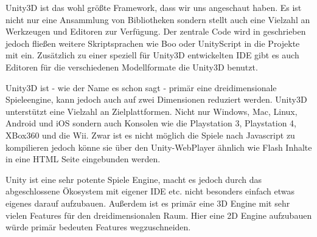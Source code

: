 Unity3D ist das wohl größte Framework, dass wir uns angeschaut haben. Es ist nicht nur eine Ansammlung von Bibliotheken sondern stellt auch eine Vielzahl an Werkzeugen und Editoren zur Verfügung. Der zentrale Code wird in \CS geschrieben jedoch fließen weitere Skriptsprachen wie Boo oder UnityScript in die Projekte mit ein.
Zusätzlich zu einer speziell für Unity3D entwickelten IDE gibt es auch Editoren für die verschiedenen Modellformate die Unity3D benutzt.

Unity3D ist - wie der Name es schon sagt - primär eine dreidimensionale Spieleengine, kann jedoch auch auf zwei Dimensionen reduziert werden.
Unity3D unterstützt eine Vielzahl an Zielplattformen. Nicht nur Windows, Mac, Linux, Android und iOS sondern auch Konsolen wie die Playstation 3, Playstation 4, XBox360 und die Wii. Zwar ist es nicht möglich die Spiele nach Javascript zu kompilieren jedoch könne sie über den Unity-WebPlayer ähnlich wie Flash Inhalte in eine HTML Seite eingebunden werden.

Unity ist eine sehr potente Spiele Engine, macht es jedoch durch das abgeschlossene Ökosystem mit eigener IDE etc. nicht besonders einfach etwas eigenes darauf aufzubauen. Außerdem ist es primär eine 3D Engine mit sehr vielen Features für den dreidimensionalen Raum. Hier eine 2D Engine aufzubauen würde primär bedeuten Features wegzuschneiden.